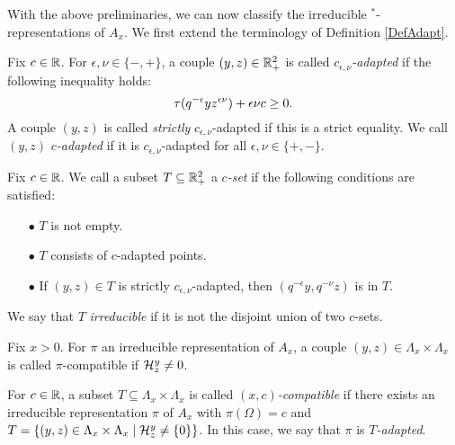 
With the above preliminaries, we can now classify the irreducible $^*$-representations of $A_x$. We first extend the terminology of Definition \ref{DefAdapt}.


\begin{Def} Fix $c\in \mathbb{R}$. For $\epsilon,\nu\in \{-,+\}$, a couple $(y,z)\in \mathbb{R}_+^2$ is called \emph{$c_{\epsilon,\nu}$-adapted} if the following inequality holds: \begin{equation}\label{EqAd} \operatorname{\tau}(q^{-\epsilon}yz^{\epsilon\nu})+\epsilon\nu c\geq 0.\end{equation} A couple $(y,z)$ is called \emph{strictly} $c_{\epsilon,\nu}$-adapted if this is a strict equality. We call $(y,z)$ \emph{$c$-adapted} if it is $c_{\epsilon,\nu}$-adapted for all $\epsilon,\nu\in \{+,-\}$. 
\end{Def} 

\begin{Def} Fix $c\in \mathbb{R}$. We call a subset $T\subseteq \mathbb{R}_+^2$ a \emph{$c$-set} if the following conditions are satisfied: 
\begin{itemize} 
\item[$\bullet$] $T$ is not empty.
\item[$\bullet$] $T$ consists of $c$-adapted points.
\item[$\bullet$] If $(y,z)\in T$ is strictly $c_{\epsilon,\nu}$-adapted, then $(q^{-\epsilon}y,q^{-\nu}z)$ is in $T$.
\end{itemize}

We say that $T$ \emph{irreducible} if it is not the disjoint union of two $c$-sets.

\end{Def}

\begin{Def} Fix $x>0$. For $\pi$ an irreducible representation of $A_x$, a couple $(y,z)\in \Lambda_x\times \Lambda_x$ is called $\pi$-compatible if $\mathcal{H}^y_z\neq 0$. 

For $c\in \mathbb{R}$, a subset $T\subseteq \Lambda_x\times \Lambda_x$ is called \emph{$(x,c)$-compatible} if there exists an irreducible representation $\pi$ of $A_x$ with $\pi(\Omega) = c$ and $T=\{(y,z)\in \Lambda_x\times \Lambda_x\mid \mathcal{H}^{y}_{z}\neq \{0\}\}$. In this case, we say that $\pi$ is \emph{$T$-adapted}.
\end{Def}

